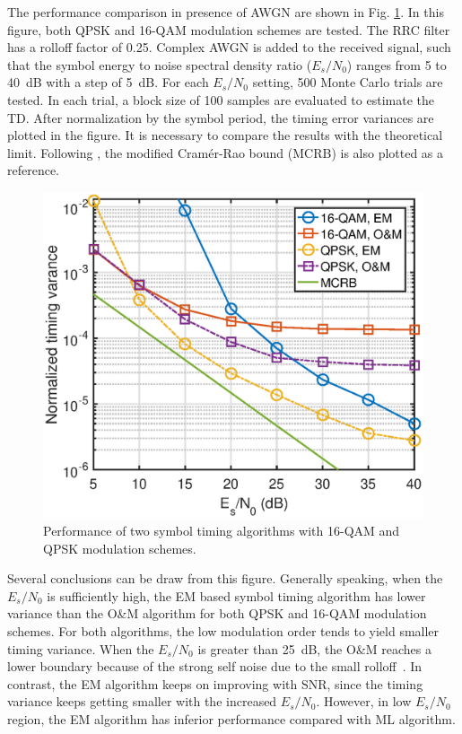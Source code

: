\documentclass[journal,comsoc,onecolumn, 12pt,draftclsnofoot]{IEEEtran}
\begin{document}
The performance comparison in presence of AWGN are shown in Fig. \ref{fig:timing_per}.
In this figure, both QPSK and 16-QAM modulation schemes are tested.
The RRC filter has a rolloff factor of 0.25. 
Complex AWGN is added to the received signal, such that the symbol energy to noise spectral density ratio (\(E_s/N_0\)) ranges from 5 to 40~dB with a step of 5~dB.
For each \(E_s/N_0\) setting, 500 Monte Carlo trials are tested.
In each trial, a block size of 100 samples are evaluated to estimate the TD.
After normalization by the symbol period, the timing error variances are plotted in the figure.
It is necessary to compare the results with the theoretical limit.
Following \cite{mengali1997synchronization}, the modified Cram\'er-Rao bound (MCRB) is also plotted as a reference.

\begin{figure}[ht]
\centering
\includegraphics[width=3 in]{pic/per_timing.eps}
\caption{Performance of two symbol timing algorithms with 16-QAM and QPSK modulation schemes.}
\label{fig:timing_per} 
\end{figure}   

Several conclusions can be draw from this figure.
Generally speaking, when the  \(E_s/N_0\) is sufficiently high, the EM based symbol timing algorithm has lower variance than the O\&M algorithm for both QPSK and 16-QAM modulation schemes.
For both algorithms, the low modulation order tends to yield smaller timing variance.
When the \(E_s/N_0\) is greater than 25~dB, the O\&M reaches a lower boundary because of the strong self noise due to the small rolloff~\cite{mengali1997synchronization}. 
% 
% 
In contrast, the EM algorithm keeps on improving with SNR, since the timing variance keeps getting smaller with the increased \(E_s/N_0\).
However, in low \(E_s/N_0\) region, the EM algorithm has inferior performance compared with ML algorithm.
\end{document}
